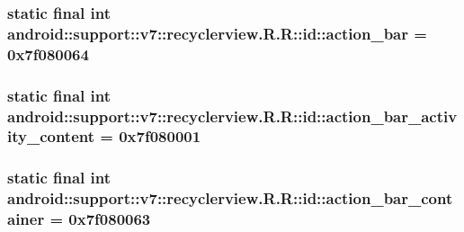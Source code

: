 \hypertarget{classandroid_1_1support_1_1v7_1_1recyclerview_1_1_r_1_1id_3b2d2c77cc00399460c7c796fd35845f}{
\subsubsection[{action\_\-bar}]{\setlength{\rightskip}{0pt plus 5cm}static final int android::support::v7::recyclerview.R.R::id::action\_\-bar = 0x7f080064}}
\label{classandroid_1_1support_1_1v7_1_1recyclerview_1_1_r_1_1id_3b2d2c77cc00399460c7c796fd35845f}


\hypertarget{classandroid_1_1support_1_1v7_1_1recyclerview_1_1_r_1_1id_5d9c3f6b11e0fa1d9649e7a5702dc446}{
\subsubsection[{action\_\-bar\_\-activity\_\-content}]{\setlength{\rightskip}{0pt plus 5cm}static final int android::support::v7::recyclerview.R.R::id::action\_\-bar\_\-activity\_\-content = 0x7f080001}}
\label{classandroid_1_1support_1_1v7_1_1recyclerview_1_1_r_1_1id_5d9c3f6b11e0fa1d9649e7a5702dc446}


\hypertarget{classandroid_1_1support_1_1v7_1_1recyclerview_1_1_r_1_1id_8354e6075b749e44648b7b9aa4ddc6e4}{
\subsubsection[{action\_\-bar\_\-container}]{\setlength{\rightskip}{0pt plus 5cm}static final int android::support::v7::recyclerview.R.R::id::action\_\-bar\_\-container = 0x7f080063}}
\label{classandroid_1_1support_1_1v7_1_1recyclerview_1_1_r_1_1id_8354e6075b749e44648b7b9aa4ddc6e4}


